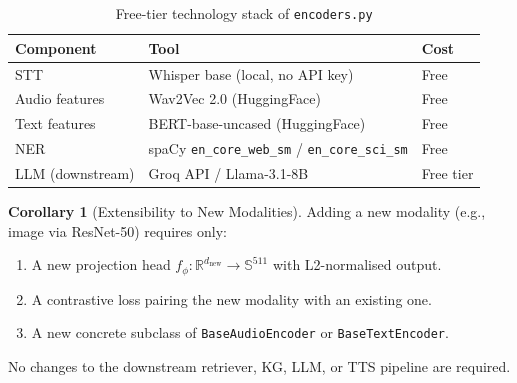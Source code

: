 \documentclass[12pt,a4paper]{article}
\theoremstyle{definition}
\newtheorem{corollary}[theorem]{Corollary}
\theoremstyle{remark}
\begin{document}
\begin{table}[H]
\centering
\caption{Free-tier technology stack of \texttt{encoders.py}}
\begin{tabular}{lll}
\toprule
Component & Tool & Cost \\
\midrule
STT & Whisper base (local, no API key) & Free \\
Audio features & Wav2Vec 2.0 (HuggingFace) & Free \\
Text features & BERT-base-uncased (HuggingFace) & Free \\
NER & spaCy \texttt{en\_core\_web\_sm} / \texttt{en\_core\_sci\_sm} & Free \\
LLM (downstream) & Groq API / Llama-3.1-8B & Free tier \\
\bottomrule
\end{tabular}
\end{table}

\begin{corollary}[Extensibility to New Modalities]
Adding a new modality (e.g., image via ResNet-50) requires only:
\begin{enumerate}
  \item A new projection head $f_\phi : \mathbb{R}^{d_{\text{new}}} \to \mathbb{S}^{511}$
        with L2-normalised output.
  \item A contrastive loss pairing the new modality with an existing one.
  \item A new concrete subclass of \texttt{BaseAudioEncoder} or \texttt{BaseTextEncoder}.
\end{enumerate}
No changes to the downstream retriever, KG, LLM, or TTS pipeline are required.
\end{corollary}
\end{document}
